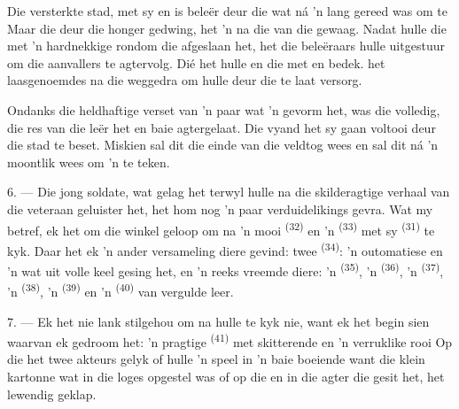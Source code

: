 Die versterkte stad, met sy  en  is beleër deur die
 wat ná 'n lang  gereed was om te
 Maar die  deur die honger gedwing, het 'n
 na die  van die  gewaag. Nadat
hulle die  met 'n hardnekkige  rondom die
 afgeslaan het, het die  beleëraars hulle
 uitgestuur om die  aanvallers te agtervolg. Dié het
hulle  en die  met  en
 bedek.  het laasgenoemdes na die
 weggedra om hulle deur die  te laat versorg.

Ondanks die heldhaftige verset van 'n paar  wat 'n 
gevorm het, was die  volledig, die res van die leër het
 en baie  agtergelaat. Die vyand het sy
 gaan voltooi deur die stad te beset. Miskien sal dit die einde van
die veldtog wees en sal dit ná 'n  moontlik wees om 'n
 te teken.

\VUsaut{4.4mm}
\VUsaut{2.8mm}

6. --- Die jong soldate, wat gelag het terwyl hulle na die skilderagtige verhaal van die
veteraan geluister het, het hom nog 'n paar verduidelikings gevra. Wat my betref, ek het
om die winkel geloop om na 'n mooi  \textsuperscript{(32)} en 'n
 \textsuperscript{(33)} met sy  \textsuperscript{(31)} te kyk.
Daar het ek 'n ander versameling diere gevind: twee 
\textsuperscript{(34)}: 'n outomatiese  en 'n  wat
uit volle keel gesing het, en 'n reeks vreemde diere: 'n 
\textsuperscript{(35)}, 'n  \textsuperscript{(36)}, 'n 
\textsuperscript{(37)}, 'n  \textsuperscript{(38)}, 'n 
\textsuperscript{(39)} en 'n  \textsuperscript{(40)} van vergulde leer.

7. --- Ek het nie lank stilgehou om na hulle te kyk nie, want ek het begin sien waarvan
ek gedroom het: 'n pragtige  \textsuperscript{(41)} met
skitterende  en 'n verruklike rooi  Op die
 het twee akteurs gelyk of hulle 'n  speel in 'n baie
boeiende  want die klein kartonne  wat in die
loges opgestel was of op die  en in die  agter die
 gesit het, het lewendig geklap.

